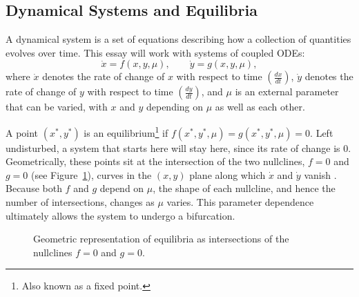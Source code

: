 \subsection{Dynamical Systems and Equilibria}\label{subsec:dynamical-systems-and-equilibria}

    A dynamical system is a set of equations describing how a collection of quantities evolves over time. This essay will work with systems of coupled ODEs:
    \[
        \dot{x} = f\left(x,y,\mu\right), \qquad \dot{y} = g\left(x,y,\mu\right),
    \]
    where $\dot{x}$ denotes the rate of change of $x$ with respect to time $\left(\frac{dx}{dt}\right)$, $\dot{y}$ denotes the rate of change of $y$ with respect to time $\left(\frac{dy}{dt}\right)$, and $\mu$ is an external parameter that can be varied, with $x$ and $y$ depending on $\mu$ as well as each other.


    A point $\left(x^*,y^*\right)$ is an equilibrium\footnote{Also known as a fixed point.} if $f(x^*,y^*,\mu)=g(x^*,y^*,\mu)=0$. Left undisturbed, a system that starts here will stay here, since its rate of change is 0. Geometrically, these points sit at the intersection of the two nullclines, $f=0$ and $g=0$ (see Figure~\ref{fig:equilibrium}), curves in the $(x,y)$ plane along which $\dot{x}$ and $\dot{y}$ vanish \parencite{strogatzNonlinearDynamics2018}. Because both $f$ and $g$ depend on $\mu$, the shape of each nullcline, and hence the number of intersections, changes as $\mu$ varies. This parameter dependence ultimately allows the system to undergo a bifurcation.

    \begin{figure}[H]
    \centering
    \caption{Geometric representation of equilibria as intersections of the nullclines $f=0$ and $g=0$.}
    \label{fig:equilibrium}
\end{figure}


